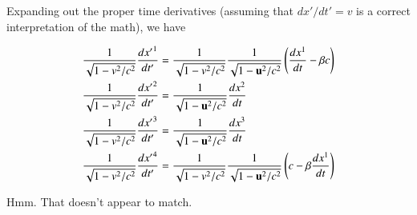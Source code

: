 \documentclass{article}
\begin{document}
Expanding out the proper time derivatives (assuming that $dx'/dt' = v$ is a correct interpretation of the math), we have

\begin{align*}
\frac{1}{\sqrt{1 - v^2/c^2}} \frac{{dx'}^1}{dt'} &= \frac{1}{\sqrt{1 - v^2/c^2}} \frac{1}{\sqrt{1 - \mathbf{u}^2/c^2}} \left( \frac{dx^1}{dt} - \beta c \right) \\
\frac{1}{\sqrt{1 - v^2/c^2}} \frac{{dx'}^2}{dt'} &= \frac{1}{\sqrt{1 - \mathbf{u}^2/c^2}} \frac{dx^2}{dt} \\
\frac{1}{\sqrt{1 - v^2/c^2}} \frac{{dx'}^3}{dt'} &= \frac{1}{\sqrt{1 - \mathbf{u}^2/c^2}} \frac{dx^3}{dt} \\
\frac{1}{\sqrt{1 - v^2/c^2}} \frac{{dx'}^4}{dt'} &= \frac{1}{\sqrt{1 - v^2/c^2}} \frac{1}{\sqrt{1 - \mathbf{u}^2/c^2}} \left( c - \beta \frac{dx^1}{dt} \right)
\end{align*}

Hmm.  That doesn't appear to match.



\end{document}
